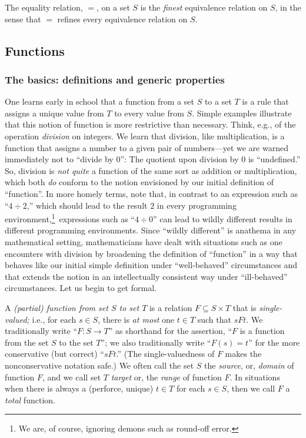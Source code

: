 \begin{theorem}
\label{thm:equality=finest-equiv}
The equality relation, $=$, on a set $S$ is the {\em finest} equivalence relation on $S$, in the sense that $=$ refines every equivalence relation on $S$.
\end{theorem}

\subsection{Functions}
\label{sec:function}

\subsubsection{The basics: definitions and generic properties}
\label{sec:basic-functions}

One learns early in school that a function from a set $S$ to a set $T$ is a rule that assigns a unique value from $T$ to every value from $S$.  Simple examples illustrate that this notion of function is more restrictive than necessary.  Think, e.g., of the operation {\em division} on integers.  We learn that division, like multiplication, is a function that assigns a number to a given pair of numbers---yet we are warned immediately not to ``divide by $0$'': The quotient upon division by $0$ is ``undefined.''  So, division is {\em not quite} a function of the same sort as addition or multiplication, which both {\em do} conform to the notion envisioned by our initial definition of ``function''.  In more homely terms, note that, in contrast to an expression such as ``$4 \div 2$,'' which should lead to the result $2$ in every programming environment,\footnote{We are, of course, ignoring demons such as round-off error.}~expressions such as ``$4 \div 0$'' can lead to wildly different results in different programming environments.  Since ``wildly different'' is anathema in any mathematical setting, mathematicians have dealt with situations such as one encounters with division by broadening the definition of ``function'' in a way that behaves like our initial simple definition under ``well-behaved'' circumstances and that extends the notion in an intellectually consistent way under ``ill-behaved'' circumstances.  Let us begin to get formal.

\medskip

 
 
A {\it (partial) function from set $S$ to set $T$} is a relation $F \subseteq S \times T$ that is {\it single-valued;} i.e., for each $s \in S$, there is {\em at most} one $t \in T$ such that $sFt$.  We
traditionally write ``$F: S \rightarrow T$'' as shorthand for the assertion, ``$F$ is a function from the set $S$ to the set $T$''; we also traditionally write ``$F(s) = t$'' for the more conservative (but
correct) ``$sFt$.''  (The single-valuedness of $F$ makes the nonconservative notation safe.)  We often call the set $S$ the {\em source}, or, {\it domain} of function $F$, and we call set $T$ {\em
  target} or, the {\it range} of function $F$.  In situations when there is always a (perforce, unique) $t \in T$ for each $s \in S$, then we call $F$ a {\em total} function.


